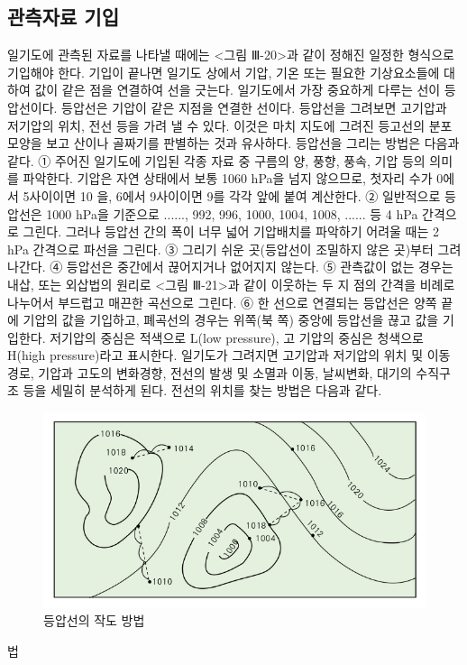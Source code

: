 \subsection{관측자료 기입}
일기도에 관측된 자료를 나타낼 때에는 <그림 Ⅲ-20>과 같이 정해진 일정한 형식으로 기입해야 한다. 기입이 끝나면 일기도 상에서 기압, 기온 또는 필요한 기상요소들에 대하여 값이 같은 점을 연결하여 선을 긋는다. 일기도에서 가장 중요하게 다루는 선이 등압선이다. 등압선은 기압이 같은 지점을 연결한 선이다. 등압선을 그려보면 고기압과 저기압의 위치, 전선 등을 가려 낼 수 있다. 이것은 마치 지도에 그려진 등고선의 분포모양을 보고 산이나 골짜기를 판별하는 것과 유사하다. 등압선을 그리는 방법은 다음과 같다.
① 주어진 일기도에 기입된 각종 자료 중 구름의 양, 풍향, 풍속, 기압 등의 의미를 파악한다.
기압은 자연 상태에서 보통 1060 hPa을 넘지 않으므로, 첫자리 수가 0에서 5사이이면 10
을, 6에서 9사이이면 9를 각각 앞에 붙여 계산한다.
② 일반적으로 등압선은 1000 hPa을 기준으로 ......, 992, 996, 1000, 1004, 1008, ...... 등 4 hPa 간격으로 그린다. 그러나 등압선 간의 폭이 너무 넓어 기압배치를 파악하기 어려울
때는 2 hPa 간격으로 파선을 그린다.
③ 그리기 쉬운 곳(등압선이 조밀하지 않은 곳)부터 그려 나간다.
④ 등압선은 중간에서 끊어지거나 없어지지 않는다.
⑤ 관측값이 없는 경우는 내삽, 또는 외삽법의 원리로 <그림 Ⅲ-21>과 같이 이웃하는 두 지
점의 간격을 비례로 나누어서 부드럽고 매끈한 곡선으로 그린다.
⑥ 한 선으로 연결되는 등압선은 양쪽 끝에 기압의 값을 기입하고, 폐곡선의 경우는 위쪽(북
쪽) 중앙에 등압선을 끊고 값을 기입한다. 저기압의 중심은 적색으로 L(low pressure), 고
기압의 중심은 청색으로 H(high pressure)라고 표시한다.
일기도가 그려지면 고기압과 저기압의 위치 및 이동경로, 기압과 고도의 변화경향, 전선의
발생 및 소멸과 이동, 날씨변화, 대기의 수직구조 등을 세밀히 분석하게 된다. 전선의 위치를
찾는 방법은 다음과 같다.
\begin{figure}
	\centering
	\includegraphics[width=0.8\linewidth]{Pictures/draw-weathermap01}
	\caption{등압선의 작도 방법}
	\label{fig:draw-weathermap01}
\end{figure}법

